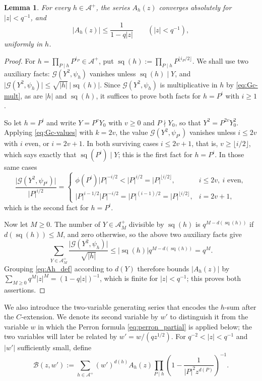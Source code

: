 \documentclass[a4paper,reqno]{amsart}
\numberwithin{equation}{section}
\newtheorem{lemma}[theorem]{Lemma}
\theoremstyle{remark}
\theoremstyle{definition}
\newcommand{\A}{\mathcal{A}}
\newcommand{\Gc}{\mathcal{G}}
\begin{document}
\begin{lemma}
For every $h\in\A^+$, the series $A_h(z)$ converges absolutely
for $|z|<q^{-1}$, and
\begin{equation}\label{eq:Ah-uniform}
\bigl|A_h(z)\bigr|\le\frac{1}{1-q|z|}
\qquad(|z|<q^{-1}),
\end{equation}
uniformly in $h$.
\end{lemma}

\begin{proof}
For $h=\prod_{P\mid h}P^{i_P}\in\A^+$, put
$\operatorname{sq}(h):=\prod_{P\mid h}P^{\lfloor i_P/2\rfloor}$. We shall use
two auxiliary facts: $\Gc(Y^2,\psi_h)$ vanishes unless
$\operatorname{sq}(h)\mid Y$, and
$\bigl|\Gc(Y^2,\psi_h)\bigr|\le\sqrt{|h|}\,\bigl|\operatorname{sq}(h)\bigr|$.
Since $\Gc(Y^2,\psi_h)$ is multiplicative in $h$ by \eqref{eq:Gc-mult}, as
are $|h|$ and $\operatorname{sq}(h)$, it suffices to prove both facts for
$h=P^i$ with $i\ge1$.

So let $h=P^i$ and write $Y=P^vY_0$ with $v\ge0$ and $P\nmid Y_0$, so that
$Y^2=P^{2v}Y_0^2$. Applying \eqref{eq:Gc-values} with $k=2v$, the value
$\Gc(Y^2,\psi_{P^i})$ vanishes unless $i\le2v$ with $i$ even, or $i=2v+1$.
In both surviving cases $i\le2v+1$, that is, $v\ge\lfloor i/2\rfloor$, which
says exactly that $\operatorname{sq}(P^i)\mid Y$; this is the first fact for
$h=P^i$. In those same cases
$$
\frac{\bigl|\Gc(Y^2,\psi_{P^i})\bigr|}{|P|^{i/2}}
=
\begin{cases}
\phi(P^i)|P|^{-i/2}<|P|^{i/2}=|P|^{\lfloor i/2\rfloor},
& i\le2v,\ i\text{ even},\\[4pt]
|P|^{i-1/2}|P|^{-i/2}=|P|^{(i-1)/2}=|P|^{\lfloor i/2\rfloor},
& i=2v+1,
\end{cases}
$$
which is the second fact for $h=P^i$.

Now let $M\ge0$. The number of $Y\in\A_M^+$ divisible by
$\operatorname{sq}(h)$ is $q^{M-d(\operatorname{sq}(h))}$ if
$d(\operatorname{sq}(h))\le M$, and zero otherwise, so the above two
auxiliary facts give
$$
\sum_{Y\in\A_M^+}\frac{\bigl|\Gc(Y^2,\psi_h)\bigr|}{\sqrt{|h|}}
\le\bigl|\operatorname{sq}(h)\bigr|q^{M-d(\operatorname{sq}(h))}=q^M .
$$
Grouping \eqref{eq:Ah_def} according to $d(Y)$ therefore bounds
$|A_h(z)|$ by $\sum_{M\ge0}q^M|z|^M=(1-q|z|)^{-1}$, which is finite for
$|z|<q^{-1}$; this proves both assertions.
\end{proof}

We also introduce the two-variable generating series that encodes the
$h$-sum after the $C$-extension. We denote its second variable by $w'$
to distinguish it from the variable $w$ in which the Perron formula
\eqref{eq:perron_partial} is applied below; the two variables will later be
related by $w'=w/(qz^{1/2})$.
For $q^{-2}<|z|<q^{-1}$ and $|w'|$ sufficiently small, define
\begin{equation}\label{eq:B_def}
\mathcal B(z,w')
:=
\sum_{h\in\A^+}
(w')^{d(h)}A_h(z)
\prod_{P\mid h}
\left(
1-\frac{1}{|P|^2z^{d(P)}}
\right)^{-1}.
\end{equation}
\end{document}
